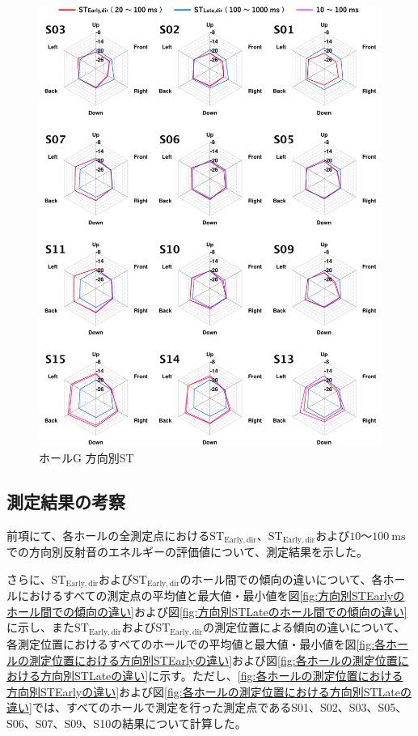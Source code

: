 \documentclass[11pt,a4j]{jreport}
\begin{document}
\newpage

\begin{figure}[H]
  \centering
  \includegraphics[scale=.77]{images/realHallDirSt/allPoint/reshaped/gRightPage.pdf}
  \caption{ホールG 方向別ST}
  \label{fig:ホールG 方向別ST}
\end{figure}

\clearpage

\subsection*{測定結果の考察}

前項にて、各ホールの全測定点における$\mathrm{ST_{Early,dir}}$、$\mathrm{ST_{Early,dir}}$および$10$～$\SI{100}{\ms}$での方向別反射音のエネルギーの評価値について、測定結果を示した。

さらに、$\mathrm{ST_{Early,dir}}$および$\mathrm{ST_{Early,dir}}$のホール間での傾向の違いについて、各ホールにおけるすべての測定点の平均値と最大値・最小値を図\ref{fig:方向別STEarlyのホール間での傾向の違い}および図\ref{fig:方向別STLateのホール間での傾向の違い}に示し、また$\mathrm{ST_{Early,dir}}$および$\mathrm{ST_{Early,dir}}$の測定位置による傾向の違いについて、各測定位置におけるすべてのホールでの平均値と最大値・最小値を図\ref{fig:各ホールの測定位置における方向別STEarlyの違い}および図\ref{fig:各ホールの測定位置における方向別STLateの違い}に示す。ただし、\ref{fig:各ホールの測定位置における方向別STEarlyの違い}および図\ref{fig:各ホールの測定位置における方向別STLateの違い}では、すべてのホールで測定を行った測定点であるS01、S02、S03、S05、S06、S07、S09、S10の結果について計算した。
\end{document}
